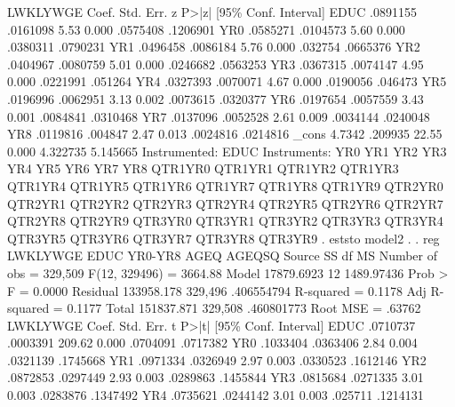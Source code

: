 {\smallskip}
    LWKLYWGE {\VBAR}      Coef.   Std. Err.      z    P>|z|     [95\% Conf. Interval]
        EDUC {\VBAR}   .0891155   .0161098     5.53   0.000     .0575408    .1206901
         YR0 {\VBAR}   .0585271   .0104573     5.60   0.000     .0380311    .0790231
         YR1 {\VBAR}   .0496458   .0086184     5.76   0.000      .032754    .0665376
         YR2 {\VBAR}   .0404967   .0080759     5.01   0.000     .0246682    .0563253
         YR3 {\VBAR}   .0367315   .0074147     4.95   0.000     .0221991     .051264
         YR4 {\VBAR}   .0327393   .0070071     4.67   0.000     .0190056     .046473
         YR5 {\VBAR}   .0196996   .0062951     3.13   0.002     .0073615    .0320377
         YR6 {\VBAR}   .0197654   .0057559     3.43   0.001     .0084841    .0310468
         YR7 {\VBAR}   .0137096   .0052528     2.61   0.009     .0034144    .0240048
         YR8 {\VBAR}   .0119816    .004847     2.47   0.013     .0024816    .0214816
       _cons {\VBAR}     4.7342    .209935    22.55   0.000     4.322735    5.145665
Instrumented:  EDUC
Instruments:   YR0 YR1 YR2 YR3 YR4 YR5 YR6 YR7 YR8 QTR1YR0 QTR1YR1 QTR1YR2
               QTR1YR3 QTR1YR4 QTR1YR5 QTR1YR6 QTR1YR7 QTR1YR8 QTR1YR9
               QTR2YR0 QTR2YR1 QTR2YR2 QTR2YR3 QTR2YR4 QTR2YR5 QTR2YR6
               QTR2YR7 QTR2YR8 QTR2YR9 QTR3YR0 QTR3YR1 QTR3YR2 QTR3YR3
               QTR3YR4 QTR3YR5 QTR3YR6 QTR3YR7 QTR3YR8 QTR3YR9
{\smallskip}
. eststo model2
{\smallskip}
. 
. reg  LWKLYWGE EDUC  YR0-YR8 AGEQ AGEQSQ 
{\smallskip}
      Source {\VBAR}       SS           df       MS      Number of obs   =   329,509
   F(12, 329496)   =   3664.88
       Model {\VBAR}  17879.6923        12  1489.97436   Prob > F        =    0.0000
    Residual {\VBAR}  133958.178   329,496  .406554794   R-squared       =    0.1178
   Adj R-squared   =    0.1177
       Total {\VBAR}  151837.871   329,508  .460801773   Root MSE        =    .63762
{\smallskip}
    LWKLYWGE {\VBAR}      Coef.   Std. Err.      t    P>|t|     [95\% Conf. Interval]
        EDUC {\VBAR}   .0710737   .0003391   209.62   0.000     .0704091    .0717382
         YR0 {\VBAR}   .1033404   .0363406     2.84   0.004     .0321139    .1745668
         YR1 {\VBAR}   .0971334   .0326949     2.97   0.003     .0330523    .1612146
         YR2 {\VBAR}   .0872853   .0297449     2.93   0.003     .0289863    .1455844
         YR3 {\VBAR}   .0815684   .0271335     3.01   0.003     .0283876    .1347492
         YR4 {\VBAR}   .0735621   .0244142     3.01   0.003      .025711    .1214131
